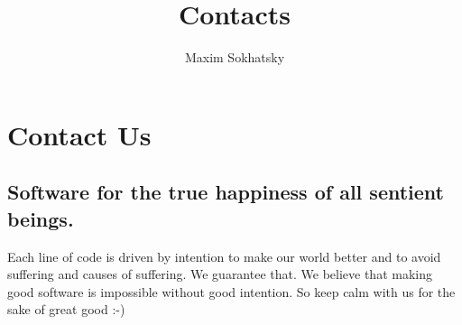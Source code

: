 \documentclass[11pt]{article}
\begin{document}
\title{Contacts}
\author{Maxim Sokhatsky}


\section*{Contact Us}

\subsection*{Software for the true happiness of all sentient beings.}

Each line of code is driven by intention to make our world better and to
avoid suffering and causes of suffering. We guarantee that.
We believe that making good software is impossible without good intention.
So keep calm with us for the sake of great good :-)


\end{document}

